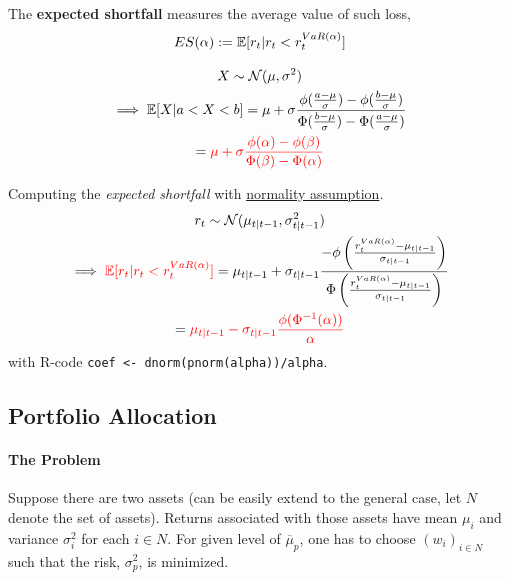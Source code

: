 \documentclass[11pt]{article}
\begin{document}
			\begin{definition}
				The \textbf{expected shortfall} measures the average value of such loss,
				\begin{equation}
					ES(\alpha) := \mathbb{E}[{r_t|r_t < r_t^{VaR(\alpha)}}]
				\end{equation}
			\end{definition}
			
			\begin{lemma}
				\begin{gather}
					X \sim \mathcal{{N}}(\mu, \sigma^2) \\
					\implies \mathbb{E}[{X|a < X < b}] = \mu + \sigma \frac{\phi(\frac{a - \mu}{\sigma}) - \phi(\frac{b - \mu}{\sigma})}{\Phi(\frac{b - \mu}{\sigma}) - \Phi(\frac{a - \mu}{\sigma})} \\
					= \textcolor{red}{\mu + \sigma \frac{\phi(\alpha) - \phi(\beta)}{\Phi(\beta) - \Phi(\alpha)}}
				\end{gather}
			\end{lemma}
			
			\begin{proposition}
				Computing the \emph{expected shortfall} with \ul{normality assumption}.
				\begin{gather}
					r_t \sim \mathcal{{N}}(\mu_{t|t-1}, \sigma_{t|t-1}^2) \\
					\implies \textcolor{red}{\mathbb{E}[{r_t|r_t < r_t^{VaR(\textcolor{red}{\alpha})}}]}  = \mu_{t|t-1} + \sigma_{t|t-1} 
					\frac{-\phi \left( 
						\frac{r_t^{VaR(\alpha)} - \mu_{t|t-1}}{\sigma_{t|t-1}}
					\right)}
					{\Phi \left(
						\frac{r_t^{VaR(\alpha)} - \mu_{t|t-1}}{\sigma_{t|t-1}} 
					\right)}\\
					= \textcolor{red}{\mu_{t|t-1} - \sigma_{t|t-1} \frac{\phi(\Phi^{-1}(\alpha))}{\alpha}}
				\end{gather}
				with R-code \texttt{coef <- dnorm(pnorm(alpha))/alpha}.
			\end{proposition}
		
		\subsection{Portfolio Allocation}
			\paragraph{The Problem}Suppose there are two assets (can be easily extend to the general case, let $N$ denote the set of assets). Returns associated with those assets have mean $\mu_i$ and variance $\sigma_i^2$ for each $i \in N$. For given level of $\overline{\mu}_p$, one has to choose $(w_i)_{i \in N}$ such that the risk, $\sigma^2_p$, is minimized.
			
\end{document}
